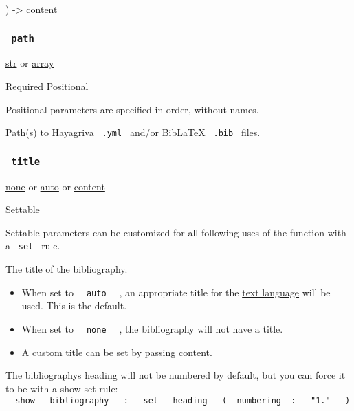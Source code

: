 ) -\textgreater{} \href{/docs/reference/foundations/content/}{content}

\subsubsection{\texorpdfstring{\texttt{\ path\ }}{ path }}\label{parameters-path}

\href{/docs/reference/foundations/str/}{str} {or}
\href{/docs/reference/foundations/array/}{array}

{Required} {{ Positional }}

\label{parameters-path-positional-tooltip}
Positional parameters are specified in order, without names.

Path(s) to Hayagriva \texttt{\ .yml\ } and/or BibLaTeX \texttt{\ .bib\ }
files.

\subsubsection{\texorpdfstring{\texttt{\ title\ }}{ title }}\label{parameters-title}

\href{/docs/reference/foundations/none/}{none} {or}
\href{/docs/reference/foundations/auto/}{auto} {or}
\href{/docs/reference/foundations/content/}{content}

{{ Settable }}

\label{parameters-title-settable-tooltip}
Settable parameters can be customized for all following uses of the
function with a \texttt{\ set\ } rule.

The title of the bibliography.

\begin{itemize}
\tightlist
\item
  When set to \texttt{\ }{\texttt{\ auto\ }}\texttt{\ } , an appropriate
  title for the \href{/docs/reference/text/text/\#parameters-lang}{text
  language} will be used. This is the default.
\item
  When set to \texttt{\ }{\texttt{\ none\ }}\texttt{\ } , the
  bibliography will not have a title.
\item
  A custom title can be set by passing content.
\end{itemize}

The bibliography\textquotesingle s heading will not be numbered by
default, but you can force it to be with a show-set rule:
\texttt{\ }{\texttt{\ show\ }}\texttt{\ }{\texttt{\ bibliography\ }}\texttt{\ }{\texttt{\ :\ }}\texttt{\ }{\texttt{\ set\ }}\texttt{\ }{\texttt{\ heading\ }}\texttt{\ }{\texttt{\ (\ }}\texttt{\ numbering\ }{\texttt{\ :\ }}\texttt{\ }{\texttt{\ "1."\ }}\texttt{\ }{\texttt{\ )\ }}\texttt{\ }

